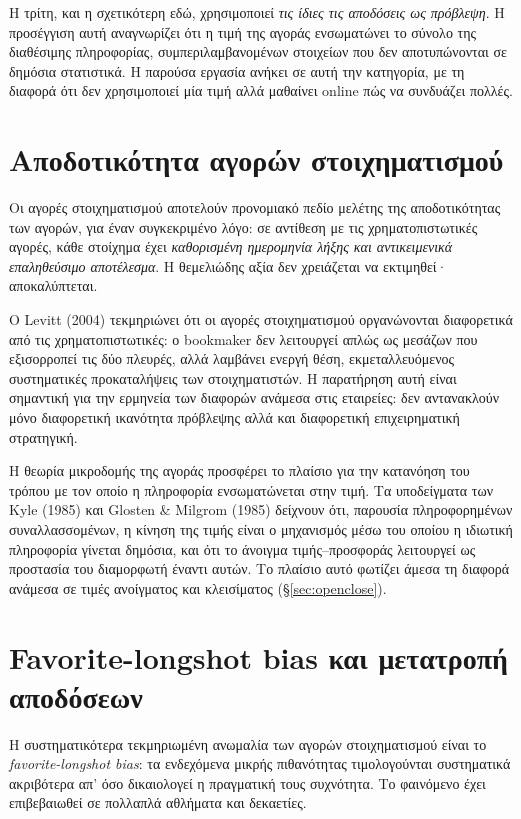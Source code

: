 \documentclass[12pt,a4paper,oneside]{report}
\renewcommand{\_}{\oldunderscore\allowbreak}
\theoremstyle{definition}
\theoremstyle{plain}
\theoremstyle{remark}
\begin{document}
Η τρίτη, και η σχετικότερη εδώ, χρησιμοποιεί \emph{τις ίδιες τις αποδόσεις ως πρόβλεψη}. Η
προσέγγιση αυτή αναγνωρίζει ότι η τιμή της αγοράς ενσωματώνει το σύνολο της διαθέσιμης
πληροφορίας, συμπεριλαμβανομένων στοιχείων που δεν αποτυπώνονται σε δημόσια στατιστικά. Η
παρούσα εργασία ανήκει σε αυτή την κατηγορία, με τη διαφορά ότι δεν χρησιμοποιεί μία τιμή
αλλά μαθαίνει online πώς να συνδυάζει πολλές.

\section{Αποδοτικότητα αγορών στοιχηματισμού}

Οι αγορές στοιχηματισμού αποτελούν προνομιακό πεδίο μελέτης της αποδοτικότητας των αγορών,
για έναν συγκεκριμένο λόγο: σε αντίθεση με τις χρηματοπιστωτικές αγορές, κάθε στοίχημα έχει
\emph{καθορισμένη ημερομηνία λήξης και αντικειμενικά επαληθεύσιμο αποτέλεσμα}. Η
θεμελιώδης αξία δεν χρειάζεται να εκτιμηθεί· αποκαλύπτεται.

Ο Levitt (2004) τεκμηριώνει ότι οι αγορές στοιχηματισμού οργανώνονται διαφορετικά από τις
χρηματοπιστωτικές: ο bookmaker δεν λειτουργεί απλώς ως μεσάζων που εξισορροπεί τις δύο
πλευρές, αλλά λαμβάνει ενεργή θέση, εκμεταλλευόμενος συστηματικές προκαταλήψεις των
στοιχηματιστών. Η παρατήρηση αυτή είναι σημαντική για την ερμηνεία των διαφορών ανάμεσα στις
εταιρείες: δεν αντανακλούν μόνο διαφορετική ικανότητα πρόβλεψης αλλά και διαφορετική
επιχειρηματική στρατηγική.

Η θεωρία μικροδομής της αγοράς προσφέρει το πλαίσιο για την κατανόηση του τρόπου με τον οποίο
η πληροφορία ενσωματώνεται στην τιμή. Τα υποδείγματα των Kyle (1985) και Glosten \& Milgrom
(1985) δείχνουν ότι, παρουσία πληροφορημένων συναλλασσομένων, η κίνηση της τιμής είναι ο
μηχανισμός μέσω του οποίου η ιδιωτική πληροφορία γίνεται δημόσια, και ότι το άνοιγμα
τιμής--προσφοράς λειτουργεί ως προστασία του διαμορφωτή έναντι αυτών. Το πλαίσιο αυτό
φωτίζει άμεσα τη διαφορά ανάμεσα σε τιμές ανοίγματος και κλεισίματος
(\S\ref{sec:openclose}).

\section{Favorite-longshot bias και μετατροπή αποδόσεων}

Η συστηματικότερα τεκμηριωμένη ανωμαλία των αγορών στοιχηματισμού είναι το
\emph{favorite-longshot bias}: τα ενδεχόμενα μικρής πιθανότητας τιμολογούνται συστηματικά
ακριβότερα απ' όσο δικαιολογεί η πραγματική τους συχνότητα. Το φαινόμενο έχει επιβεβαιωθεί
σε πολλαπλά αθλήματα και δεκαετίες.
\end{document}
